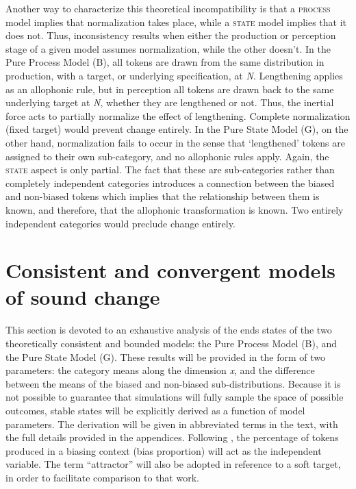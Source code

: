 Another way to characterize this theoretical incompatibility is that
a \textsc{process} model implies that normalization takes place, while
a \textsc{state} model implies that it does not. Thus, inconsistency
results when either the production or perception stage of a given
model assumes normalization, while the other doesn't. In the Pure
Process Model (B), all tokens are drawn from the same distribution
in production, with a target, or underlying specification, at \emph{N}.
Lengthening applies as an allophonic rule, but in perception all tokens
are drawn back to the same underlying target at \emph{N}, whether
they are lengthened or not. Thus, the inertial force acts to partially
normalize the effect of lengthening. Complete normalization (fixed
target) would prevent change entirely. In the Pure State Model (G),
on the other hand, normalization fails to occur in the sense that
`lengthened' tokens are assigned to their own sub-category, and no
allophonic rules apply. Again, the \textsc{state} aspect is only partial.
The fact that these are sub-categories rather than completely independent
categories introduces a connection between the biased and non-biased
tokens which implies that the relationship between them is known,
and therefore, that the allophonic transformation is known. Two entirely
independent categories would preclude change entirely. 

\section{\label{sec:Model-Behavior}Consistent and convergent models of sound change}

This section is devoted to an exhaustive analysis of the ends states
of the two theoretically consistent and bounded models: the Pure Process
Model (B), and the Pure State Model (G). These results will be provided
in the form of two parameters: the category means along the dimension
\emph{x}, and the difference between the means of the biased and non-biased
sub-distributions. Because it is not possible to guarantee that simulations
will fully sample the space of possible outcomes, stable states will
be explicitly derived as a function of model parameters. The derivation
will be given in abbreviated terms in the text, with the full details
provided in the appendices. Following \citet{soskuthy2013phonetic,Soskuthy2015},
the percentage of tokens produced in a biasing context (bias proportion)
will act as the independent variable. The term “attractor” will
also be adopted in reference to a soft target, in order to facilitate
comparison to that work. 


